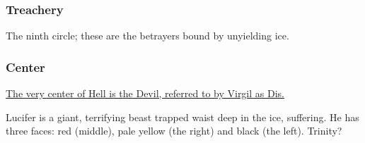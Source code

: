 \documentclass[11pt]{article}
\begin{document}
\subsubsection*{Treachery}
\label{sec:org32af7d6}
The ninth circle; these are the betrayers bound by unyielding ice.

\subsubsection*{Center}
\label{sec:org0605c97}
\uline{The very center of Hell is the Devil, referred to by Virgil as Dis.}

Lucifer is a giant, terrifying beast trapped waist deep in the ice, suffering. He has three faces: red (middle), pale yellow (the right) and black (the left). Trinity?
\end{document}
